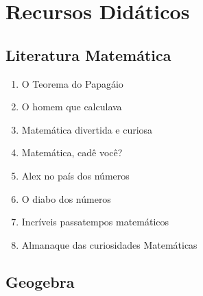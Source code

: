 \chapter{Recursos Didáticos}
\section{Literatura Matemática}

\begin{enumerate}
\item O Teorema do Papagáio
\item O homem que calculava
\item Matemática divertida e curiosa
\item Matemática, cadê você?
\item Alex no país dos números
\item O diabo dos números
\item Incríveis passatempos matemáticos
\item Almanaque das curiosidades Matemáticas
\end{enumerate}
\section{Geogebra}
